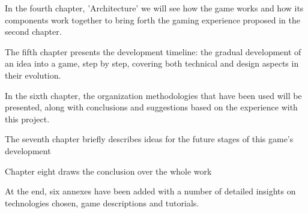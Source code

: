 In the fourth chapter, 'Architecture' we will see how the game works and how its
components work together to bring forth the gaming experience proposed in the
second chapter.\newline

The fifth chapter presents the development timeline: the gradual development of
an idea into a game, step by step, covering both technical and design aspects in
their evolution.\newline

In the sixth chapter, the organization methodologies that have been used will be
presented, along with conclusions and suggestions based on the experience with
this project.\newline

The seventh chapter briefly describes ideas for the future stages of this game's
development\newline

Chapter eight draws the conclusion over the whole work\newline

At the end, six annexes have been added with a number of detailed insights on
technologies chosen, game descriptions and tutorials.